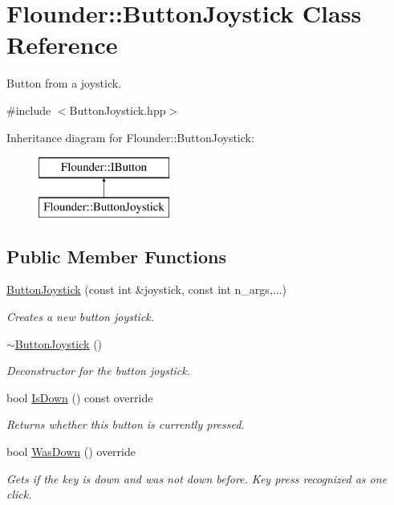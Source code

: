 \hypertarget{class_flounder_1_1_button_joystick}{}\section{Flounder\+:\+:Button\+Joystick Class Reference}
\label{class_flounder_1_1_button_joystick}


Button from a joystick.  




{\ttfamily \#include $<$Button\+Joystick.\+hpp$>$}

Inheritance diagram for Flounder\+:\+:Button\+Joystick\+:\begin{figure}[H]
\begin{center}
\leavevmode
\includegraphics[height=2.000000cm]{class_flounder_1_1_button_joystick}
\end{center}
\end{figure}
\subsection*{Public Member Functions}
\begin{DoxyCompactItemize}
\item 
\hyperlink{class_flounder_1_1_button_joystick_ab4e619c7c9c9e368f187ee54dd71c44d}{Button\+Joystick} (const int \&joystick, const int n\+\_\+args,...)
\begin{DoxyCompactList}\small\item\em Creates a new button joystick. \end{DoxyCompactList}\item 
\hyperlink{class_flounder_1_1_button_joystick_a1835a9188dfccf8b5f1d20beaaf3e637}{$\sim$\+Button\+Joystick} ()
\begin{DoxyCompactList}\small\item\em Deconstructor for the button joystick. \end{DoxyCompactList}\item 
bool \hyperlink{class_flounder_1_1_button_joystick_a32a08c87ecd633ff96fca32ff2d992b0}{Is\+Down} () const override
\begin{DoxyCompactList}\small\item\em Returns whether this button is currently pressed. \end{DoxyCompactList}\item 
bool \hyperlink{class_flounder_1_1_button_joystick_ac5d6de45e62a7c38a328f217b89573e1}{Was\+Down} () override
\begin{DoxyCompactList}\small\item\em Gets if the key is down and was not down before. Key press recognized as one click. \end{DoxyCompactList}\end{DoxyCompactItemize}
